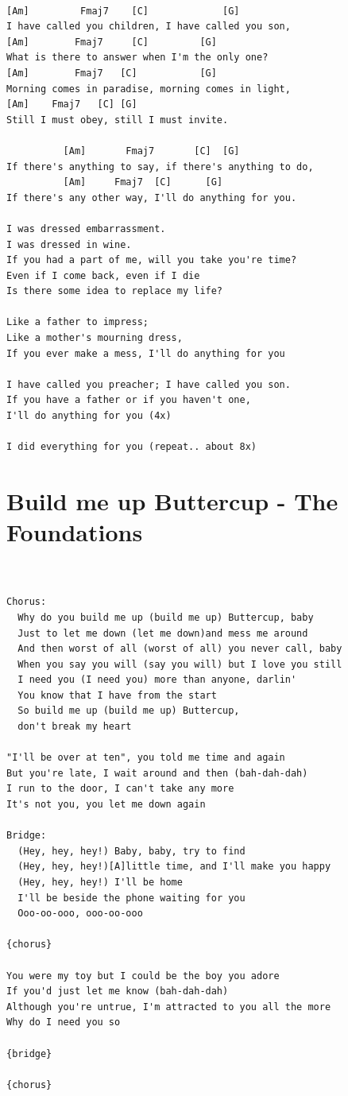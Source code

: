 \documentclass[
]{book}
\let\stdsection\section
\renewcommand\section{\clearpage\stdsection}
\begin{document}
\begin{verbatim}

[Am]         Fmaj7    [C]             [G]
I have called you children, I have called you son,
[Am]        Fmaj7     [C]         [G]
What is there to answer when I'm the only one?
[Am]        Fmaj7   [C]           [G]
Morning comes in paradise, morning comes in light,
[Am]    Fmaj7   [C] [G]
Still I must obey, still I must invite.

          [Am]       Fmaj7       [C]  [G]
If there's anything to say, if there's anything to do,
          [Am]     Fmaj7  [C]      [G]
If there's any other way, I'll do anything for you.

I was dressed embarrassment. 
I was dressed in wine. 
If you had a part of me, will you take you're time? 
Even if I come back, even if I die 
Is there some idea to replace my life? 

Like a father to impress; 
Like a mother's mourning dress, 
If you ever make a mess, I'll do anything for you 

I have called you preacher; I have called you son. 
If you have a father or if you haven't one, 
I'll do anything for you (4x)

I did everything for you (repeat.. about 8x)
\end{verbatim}

\hypertarget{build-me-up-buttercup---the-foundations}{%
\section{Build me up Buttercup - The Foundations}\label{build-me-up-buttercup---the-foundations}}

\begin{verbatim}


Chorus:
  Why do you build me up (build me up) Buttercup, baby
  Just to let me down (let me down)and mess me around
  And then worst of all (worst of all) you never call, baby
  When you say you will (say you will) but I love you still
  I need you (I need you) more than anyone, darlin'
  You know that I have from the start
  So build me up (build me up) Buttercup, 
  don't break my heart

"I'll be over at ten", you told me time and again
But you're late, I wait around and then (bah-dah-dah)
I run to the door, I can't take any more
It's not you, you let me down again

Bridge:
  (Hey, hey, hey!) Baby, baby, try to find
  (Hey, hey, hey!)[A]little time, and I'll make you happy
  (Hey, hey, hey!) I'll be home
  I'll be beside the phone waiting for you
  Ooo-oo-ooo, ooo-oo-ooo

{chorus}

You were my toy but I could be the boy you adore
If you'd just let me know (bah-dah-dah)
Although you're untrue, I'm attracted to you all the more
Why do I need you so

{bridge}

{chorus}

\end{verbatim}
\end{document}

